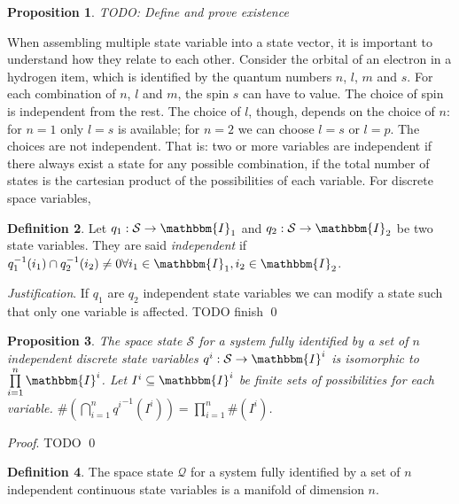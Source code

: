 \documentclass[aps,pra,10pt,twocolumn,floatfix,nofootinbib]{revtex4-1}
\newtheorem{prop}{Proposition}[section]
\theoremstyle{definition}
\newtheorem{defn}[prop]{Definition}
\newenvironment{justification}{\emph{Justification}.}{\qed}
\renewenvironment{proof}{\emph{Proof}.}{\qed}
\begin{document}
\begin{prop}\label{evolved variable}
TODO: Define and prove existence
\end{prop}


When assembling multiple state variable into a state vector, it is important to understand how they relate to each other. Consider the orbital of an electron in a hydrogen item, which is identified by the quantum numbers $n$, $l$, $m$ and $s$. For each combination of $n$, $l$ and $m$, the spin $s$ can have to value. The choice of spin is independent from the rest. The choice of $l$, though, depends on the choice of $n$: for $n=1$ only $l=s$ is available; for $n=2$ we can choose $l=s$ or $l=p$. The choices are not independent. That is: two or more variables are independent if there always exist a state for any possible combination, if the total number of states is the cartesian product of the possibilities of each variable. For discrete space variables, 

\begin{defn}\label{independent_state_variables}
Let $q_1 : \mathcal{S} \rightarrow \mathbbm{I}_1$ and $q_2 : \mathcal{S} \rightarrow \mathbbm{I}_2$ be two state variables. They are said \emph{independent} if $q_1^{-1}(i_1)\cap q_2^{-1}(i_2) \neq 0 \forall i_1 \in \mathbbm{I}_1, i_2 \in \mathbbm{I}_2$.
\end{defn}

\begin{justification}
If $q_1$ are $q_2$ independent state variables we can modify a state such that only one variable is affected. TODO finish
\end{justification}

\begin{prop}\label{discrete_state_space}
The space state $\mathcal{S}$ for a system fully identified by a set of $n$ independent discrete state variables $q^i : \mathcal{S} \rightarrow \mathbbm{I}^i$ is isomorphic to $\prod\limits_{i=1}^n\mathbbm{I}^i$. Let $I^i \subseteq \mathbbm{I}^i$ be finite sets of possibilities for each variable. $\#(\bigcap\limits_{i=1}^{n}{q^i}^{-1}(I^i))=\prod\limits_{i=1}^{n}\#(I^i)$.
\end{prop}

\begin{proof}
TODO
\end{proof}

\begin{defn}\label{continuous_state_space}
The space state $\mathcal{Q}$ for a system fully identified by a set of $n$ independent continuous state variables is a manifold of dimension $n$.
\end{defn}
\end{document}
